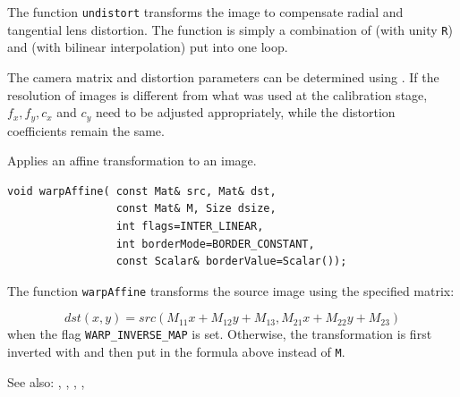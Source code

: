 The function \texttt{undistort} transforms the image to compensate
radial and tangential lens distortion. The function is simply a combination of  (with unity \texttt{R}) and  (with bilinear interpolation) put into one loop.

The camera matrix and distortion parameters can be determined using
. If the resolution of images is different from what
was used at the calibration stage, $f_x, f_y, c_x$ and $c_y$
need to be adjusted appropriately, while the distortion coefficients
remain the same.

\label{warpAffine}
Applies an affine transformation to an image.

\begin{lstlisting}
void warpAffine( const Mat& src, Mat& dst,
                 const Mat& M, Size dsize,
                 int flags=INTER_LINEAR,
                 int borderMode=BORDER_CONSTANT,
                 const Scalar& borderValue=Scalar());
\end{lstlisting}
\begin{description}
\end{description}

The function \texttt{warpAffine} transforms the source image using the specified matrix:

\[
dst(x,y) = src(M_{11} x + M_{12} y + M_{13}, M_{21} x + M_{22} y + M_{23})
\]
when the flag \texttt{WARP\_INVERSE\_MAP} is set. Otherwise, the transformation is first inverted with  and then put in the formula above instead of \texttt{M}.

See also: , , , , 

